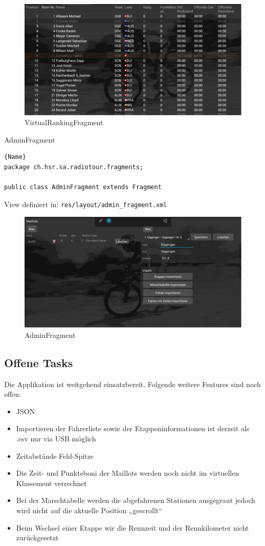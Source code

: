 \begin{figure}[h!]
\caption{VirtualRankingFragment}
\centering
\includegraphics[scale=0.9]{07anhang/images/dev_virtual.png}
\end{figure}

AdminFragment
\begin{lstlisting}{Name}
package ch.hsr.sa.radiotour.fragments;

public class AdminFragment extends Fragment
\end{lstlisting}


View definiert in:
\lstinline|res/layout/admin_fragment.xml|
 
\begin{figure}[h!]
\caption{AdminFragment}
\centering
\includegraphics[scale=0.9]{07anhang/images/dev_adminfragment.png}
\end{figure}

\subsection{Offene Tasks}
Die Applikation ist weitgehend einsatzbereit. Folgende weitere Features sind noch offen:
\begin{itemize}
\item JSON
\item Importieren der Fahrerliste sowie der Etappeninformationen ist derzeit als .csv nur via USB möglich
\item Zeitabstände Feld-Spitze
\item Die Zeit- und Punkteboni der Maillots werden noch nicht im virtuellen Klassement verrechnet
\item Bei der Marschtabelle werden die abgefahrenen Stationen ausgegraut jedoch wird nicht auf die aktuelle Position „gescrollt“
\item Beim Wechsel einer Etappe wir die Rennzeit und der Rennkilometer nicht zurückgesetzt
\end{itemize}
